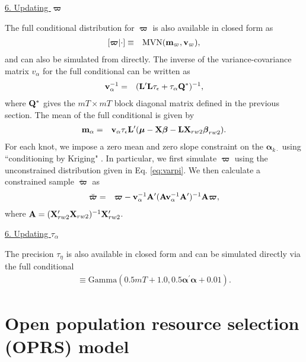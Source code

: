 \documentclass[12pt,fleqn]{article}
\begin{document}
\begin{flushleft}
\underline{6. Updating $\boldsymbol{\varpi}$}

The full conditional distribution for $\boldsymbol{\varpi}$ is also available in closed form as
\begin{eqnarray}
  \label{eq:varpi}
  [\boldsymbol{\varpi} | \cdot] & \equiv & \textrm{MVN}({\bf m}_{\varpi},{\bf v}_{\varpi}),
\end{eqnarray}
and can also be simulated from directly.  The inverse of the variance-covariance matrix $v_{\alpha}$ for the full conditional can be written as
\begin{eqnarray*}
  {\bf v}_{\alpha}^{-1} & = & ({\bf L}^{\prime}{\bf L} \tau_\epsilon + \tau_\alpha {\bf Q}^*)^{-1},
\end{eqnarray*}
where ${\bf Q}^*$ gives the $mT \times mT$ block diagonal matrix defined in the previous section.
The mean of the full conditional is given by
\begin{eqnarray*}
  {\bf m}_{\alpha} & = & {\bf v}_\alpha \tau_\epsilon {\bf L}^\prime (\boldsymbol{\mu}- {\bf X} \boldsymbol{\beta} - {\bf L}{\bf X}_{rw2}\boldsymbol{\beta}_{rw2}).
\end{eqnarray*}
For each knot, we impose a zero mean and zero slope constraint on the $\boldsymbol{\alpha}_{k \cdot}$ using ``conditioning by Kriging" \citep[cf.,][, Eq. 2.30]{RueHeld2005}.  In particular, we first simulate $\boldsymbol{\varpi}$ using the unconstrained distribution given in Eq. \ref{eq:varpi}.  We then calculate a constrained sample $\breve{\boldsymbol{\varpi}}$ as
\begin{eqnarray*}
  \breve{\boldsymbol{\varpi}} & = & \boldsymbol{\varpi}-{\bf v}_{\alpha}^{-1}{\bf A}^\prime ({\bf A}{\bf v}_{\alpha}^{-1} {\bf A}^\prime)^{-1}{\bf A} \boldsymbol{\varpi},
\end{eqnarray*}
where ${\bf A} = ({\bf X}_{rw2}^\prime {\bf X}_{rw2})^{-1} {\bf X}_{rw2}^\prime$.

\underline{6. Updating $\tau_\alpha$}

The precision $\tau_\eta$ is also available in closed form and can be simulated directly via the full conditional
\begin{eqnarray*}
  [\tau_\eta | \cdot] \equiv \textrm{Gamma}(0.5mT + 1.0,0.5 \boldsymbol{\alpha}^\prime \boldsymbol{\alpha} + 0.01).
\end{eqnarray*}

\section{Open population resource selection (OPRS) model}


\end{flushleft}
\end{document}
